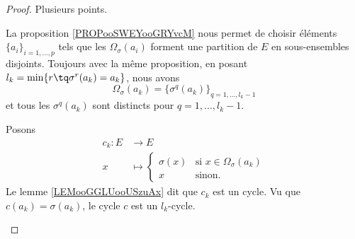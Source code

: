 \begin{proof}
	Plusieurs points.
	\begin{subproof}
		\spitem[Existence]
		La proposition \ref{PROPooSWEYooGRYvcM} nous permet de choisir éléments \( \{ a_i \}_{i=1,\ldots, p}\) tels que les \( \Omega_{\sigma}(a_i)\) forment une partition de \( E\) en sous-ensembles disjoints. Toujours avec la même proposition, en posant \( l_k=\min\{ r\tq \sigma^r(a_k)=a_k \}\), nous avons
		\begin{equation}
			\Omega_{\sigma}(a_k)=\{ \sigma^q(a_k) \}_{q=1,\ldots, l_k-1}
		\end{equation}
		et tous les \( \sigma^q(a_k)\) sont distincts pour \( q=1,\ldots, l_k-1\).

		Posons
		\begin{equation}
			\begin{aligned}
				c_k\colon E & \to E                                                    \\
				x           & \mapsto \begin{cases}
					                      \sigma(x) & \text{si } x\in \Omega_{\sigma}(a_k) \\
					                      x         & \text{sinon. }
				                      \end{cases}
			\end{aligned}
		\end{equation}
		Le lemme \ref{LEMooGGLUooUSzuAx} dit que \( c_k\) est un cycle. Vu que \( c(a_k)=\sigma(a_k)\), le cycle \( c\) est un \( l_k\)-cycle.


\end{subproof}
\end{proof}
